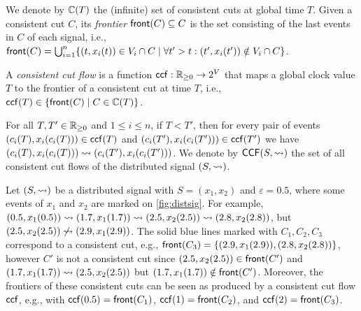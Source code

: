 We denote by $\mathbb{C}(T)$ the (infinite) set of consistent cuts at global time $T$.
Given a consistent cut $C$, its \emph{frontier} $\mathsf{front}(C) \subseteq C$ is the set consisting of the last events in $C$ of each signal, i.e., $\fr(C) = \bigcup_{i = 1}^{n} \{ (t, x_i(t)) \in V_i \cap C \st \forall t' > t : (t', x_i(t')) \notin V_i \cap C \}$.

\begin{definition}
A \emph{consistent cut flow} is a function $\mathsf{ccf} : \mathbb{R}_{\geq 0} \to 2^V$ that maps a global clock value $T$ to the frontier of a consistent cut at time $T$, i.e., $\ccf(T) \in \{\fr(C) \st C \in \CC(T)\}$.
\end{definition}

For all $T,T' \in \mathbb{R}_{\geq 0}$ and $1 \leq i \leq n$, if $T < T'$, then for every pair of events $(c_i(T), x_i(c_i(T))) \in \mathsf{ccf}(T)$ and $(c_i(T'), x_i(c_i(T'))) \in \mathsf{ccf}(T')$ we have $(c_i(T), x_i(c_i(T))) \rightsquigarrow (c_i(T'), x_i(c_i(T')))$.
We denote by $\mathsf{CCF}(S,{\rightsquigarrow})$ the set of all consistent cut flows of the distributed signal $(S,{\rightsquigarrow})$.

\begin{example} \label{ex:distsig}
	Let $(S,{\rightsquigarrow})$ be a distributed signal with $S = (x_1, x_2)$ and $\varepsilon = 0.5$, where some events of $x_1$ and $x_2$ are marked on \cref{fig:distsig}.
	For example, $(0.5, x_1(0.5)) \rightsquigarrow (1.7, x_1(1.7)) \rightsquigarrow (2.5, x_2(2.5)) \rightsquigarrow (2.8, x_2(2.8))$, but $(2.5, x_2(2.5)) \not\rightsquigarrow (2.9, x_1(2.9))$.
	The solid blue lines marked with $C_1, C_2, C_3$ correspond to a consistent cut, e.g., $\mathsf{front}(C_3) = \{(2.9, x_1(2.9)), (2.8, x_2(2.8))\}$, however $C'$ is not a consistent cut since $(2.5, x_2(2.5)) \in \mathsf{front}(C')$ and $(1.7, x_1(1.7)) \rightsquigarrow (2.5, x_2(2.5))$ but $(1.7, x_1(1.7)) \notin \mathsf{front}(C')$.
	Moreover, the frontiers of these consistent cuts can be seen as produced by a consistent cut flow $\mathsf{ccf}$, e.g., with $\mathsf{ccf}(0.5) = \mathsf{front}(C_1)$, $\mathsf{ccf}(1) = \mathsf{front}(C_2)$, and $\mathsf{ccf}(2) = \mathsf{front}(C_3)$.	
\end{example}


